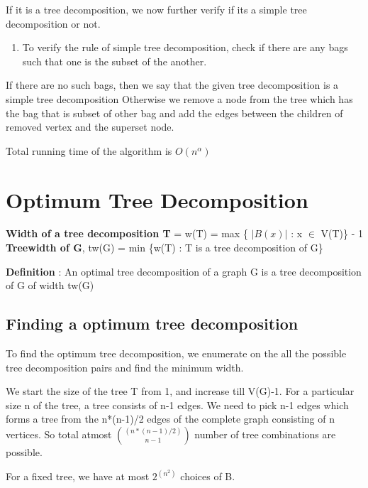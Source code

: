 If it is a tree decomposition, we now further verify if its a simple tree decomposition or not.
\begin{enumerate}
\item To verify the rule of simple tree decomposition, check 
if there are any bags such that one is the subset of the another. 
\end{enumerate}

If there are no such bags, then we say that the given tree decomposition is a simple tree decomposition 
Otherwise we remove a node from the tree which has the bag that is subset of other bag and 
add the edges between the children of removed vertex and the superset node. 

\vspace{0.3cm}
Total running time of the algorithm is $O(n^{\alpha})$

\section{Optimum Tree Decomposition}
\textbf{Width of a tree decomposition T} = w(T) = max \{ $|B(x)|$ : x $\in$ V(T)\} - 1 \\
\textbf{Treewidth of G}, tw(G) = min \{w(T) : T is a tree decomposition of G\} 


\textbf{Definition} : An optimal tree decomposition of a graph G is a tree 
decomposition of G of width tw(G) 

\subsection{Finding a optimum tree decomposition}
\vspace{0.6cm}

To find the optimum tree decomposition, we enumerate on the all the possible tree decomposition
pairs and find the minimum width.

\hspace*{1.5cm} We start the size of the tree T from 1, and increase till V(G)-1.
For a particular size n of the tree, a tree consists of n-1 edges. We need to pick n-1 edges
which forms a tree from the n*(n-1)/2 edges of the complete graph consisting of n vertices. So total 
atmost 
$\binom{(n*(n-1)/2)}{n-1}$ number of tree combinations are possible. 

\hspace*{1.5cm} For a fixed tree, we have at most $2^{(n^2)}$ choices of B. 

